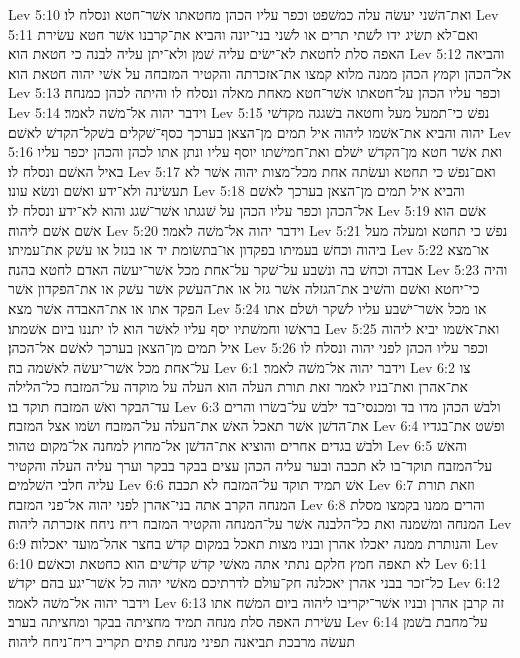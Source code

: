 Lev 5:10  ואת־השׁני יעשׂה עלה כמשׁפט וכפר עליו הכהן מחטאתו אשׁר־חטא ונסלח לו׃
Lev 5:11  ואם־לא תשׂיג ידו לשׁתי תרים או לשׁני בני־יונה והביא את־קרבנו אשׁר חטא עשׂירת האפה סלת לחטאת לא־ישׂים עליה שׁמן ולא־יתן עליה לבנה כי חטאת הוא׃
Lev 5:12  והביאה אל־הכהן וקמץ הכהן ממנה מלוא קמצו את־אזכרתה והקטיר המזבחה על אשׁי יהוה חטאת הוא׃
Lev 5:13  וכפר עליו הכהן על־חטאתו אשׁר־חטא מאחת מאלה ונסלח לו והיתה לכהן כמנחה׃
Lev 5:14  וידבר יהוה אל־משׁה לאמר׃
Lev 5:15  נפשׁ כי־תמעל מעל וחטאה בשׁגגה מקדשׁי יהוה והביא את־אשׁמו ליהוה איל תמים מן־הצאן בערכך כסף־שׁקלים בשׁקל־הקדשׁ לאשׁם׃
Lev 5:16  ואת אשׁר חטא מן־הקדשׁ ישׁלם ואת־חמישׁתו יוסף עליו ונתן אתו לכהן והכהן יכפר עליו באיל האשׁם ונסלח לו׃
Lev 5:17  ואם־נפשׁ כי תחטא ועשׂתה אחת מכל־מצות יהוה אשׁר לא תעשׂינה ולא־ידע ואשׁם ונשׂא עונו׃
Lev 5:18  והביא איל תמים מן־הצאן בערכך לאשׁם אל־הכהן וכפר עליו הכהן על שׁגגתו אשׁר־שׁגג והוא לא־ידע ונסלח לו׃
Lev 5:19  אשׁם הוא אשׁם אשׁם ליהוה׃
Lev 5:20  וידבר יהוה אל־משׁה לאמר׃
Lev 5:21  נפשׁ כי תחטא ומעלה מעל ביהוה וכחשׁ בעמיתו בפקדון או־בתשׂומת יד או בגזל או עשׁק את־עמיתו׃
Lev 5:22  או־מצא אבדה וכחשׁ בה ונשׁבע על־שׁקר על־אחת מכל אשׁר־יעשׂה האדם לחטא בהנה׃
Lev 5:23  והיה כי־יחטא ואשׁם והשׁיב את־הגזלה אשׁר גזל או את־העשׁק אשׁר עשׁק או את־הפקדון אשׁר הפקד אתו או את־האבדה אשׁר מצא׃
Lev 5:24  או מכל אשׁר־ישׁבע עליו לשׁקר ושׁלם אתו בראשׁו וחמשׁתיו יסף עליו לאשׁר הוא לו יתננו ביום אשׁמתו׃
Lev 5:25  ואת־אשׁמו יביא ליהוה איל תמים מן־הצאן בערכך לאשׁם אל־הכהן׃
Lev 5:26  וכפר עליו הכהן לפני יהוה ונסלח לו על־אחת מכל אשׁר־יעשׂה לאשׁמה בה׃
Lev 6:1  וידבר יהוה אל־משׁה לאמר׃
Lev 6:2  צו את־אהרן ואת־בניו לאמר זאת תורת העלה הוא העלה על מוקדה על־המזבח כל־הלילה עד־הבקר ואשׁ המזבח תוקד בו׃
Lev 6:3  ולבשׁ הכהן מדו בד ומכנסי־בד ילבשׁ על־בשׂרו והרים את־הדשׁן אשׁר תאכל האשׁ את־העלה על־המזבח ושׂמו אצל המזבח׃
Lev 6:4  ופשׁט את־בגדיו ולבשׁ בגדים אחרים והוציא את־הדשׁן אל־מחוץ למחנה אל־מקום טהור׃
Lev 6:5  והאשׁ על־המזבח תוקד־בו לא תכבה ובער עליה הכהן עצים בבקר בבקר וערך עליה העלה והקטיר עליה חלבי השׁלמים׃
Lev 6:6  אשׁ תמיד תוקד על־המזבח לא תכבה׃
Lev 6:7  וזאת תורת המנחה הקרב אתה בני־אהרן לפני יהוה אל־פני המזבח׃
Lev 6:8  והרים ממנו בקמצו מסלת המנחה ומשׁמנה ואת כל־הלבנה אשׁר על־המנחה והקטיר המזבח ריח ניחח אזכרתה ליהוה׃
Lev 6:9  והנותרת ממנה יאכלו אהרן ובניו מצות תאכל במקום קדשׁ בחצר אהל־מועד יאכלוה׃
Lev 6:10  לא תאפה חמץ חלקם נתתי אתה מאשׁי קדשׁ קדשׁים הוא כחטאת וכאשׁם׃
Lev 6:11  כל־זכר בבני אהרן יאכלנה חק־עולם לדרתיכם מאשׁי יהוה כל אשׁר־יגע בהם יקדשׁ׃
Lev 6:12  וידבר יהוה אל־משׁה לאמר׃
Lev 6:13  זה קרבן אהרן ובניו אשׁר־יקריבו ליהוה ביום המשׁח אתו עשׂירת האפה סלת מנחה תמיד מחציתה בבקר ומחציתה בערב׃
Lev 6:14  על־מחבת בשׁמן תעשׂה מרבכת תביאנה תפיני מנחת פתים תקריב ריח־ניחח ליהוה׃
